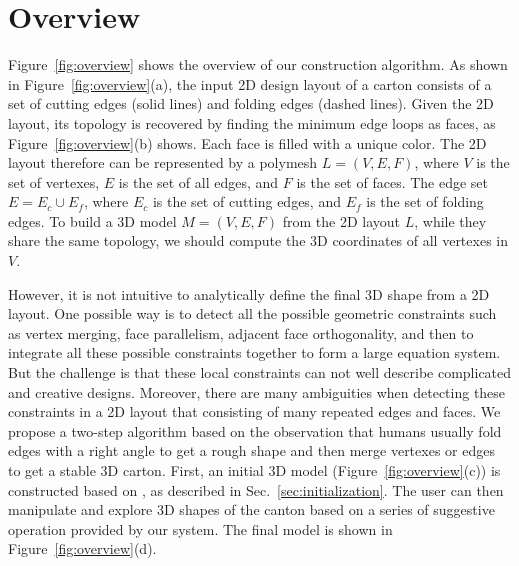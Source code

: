 \section{Overview}\label{sec:overview}




 
Figure~\ref{fig:overview} shows the overview of our construction algorithm. 
As shown in Figure~\ref{fig:overview}(a), the input 2D design layout of a carton consists of a set of cutting edges (solid lines) and folding edges (dashed lines).
%
Given the 2D layout, its topology is recovered by finding the minimum edge loops as faces, as Figure~\ref{fig:overview}(b) shows. Each face is filled with a unique color. %
The 2D layout therefore can be represented by a polymesh $L=(V,E,F)$, where $V$ is the set of vertexes, $E$ is the set of all edges, and $F$ is the set of faces. 
The edge set $E=E_c\cup E_f$, where $E_c$ is the set of cutting edges, and $E_f$ is the set of folding edges.
%
To build a 3D model $M=(V, E, F)$ from the 2D layout $L$, while they share the same topology, we should compute the 3D coordinates of all vertexes in $V$. 
%

However, it is not intuitive to analytically define the final 3D shape from a 2D layout. 
One possible way is to detect all the possible geometric constraints such as vertex merging, face parallelism, adjacent face orthogonality, and then to integrate all these possible constraints together to form a large equation system. 
But the challenge is that these local constraints can not well describe complicated and creative designs. Moreover, there are many ambiguities when detecting these constraints in a 2D layout that consisting of many repeated edges and faces. 
%
We propose a two-step algorithm based on the observation that humans usually fold edges with a right angle to get a rough shape and then merge vertexes or edges to get a stable 3D carton.
First, an initial 3D model (Figure~\ref{fig:overview}(c)) is constructed based on , as described in Sec.~\ref{sec:initialization}.
The user can then manipulate and explore 3D shapes of the canton based on a series of suggestive operation provided by our system. 
%
The final model is shown in Figure~\ref{fig:overview}(d).

